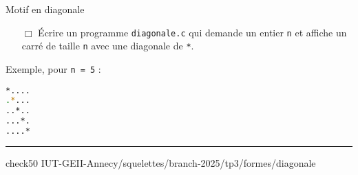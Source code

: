 \begin{UPSTIManipulation}{Motif en diagonale}
	\begin{itemize}
		\item[$\Box$] Écrire un programme \texttt{diagonale.c} qui demande un entier \texttt{n} et affiche un carré de taille \texttt{n} avec une diagonale de \texttt{*}.
	\end{itemize}
	Exemple, pour \texttt{n = 5} :
	\begin{lstlisting}[language=bash,style=console]
*....
.*...
..*..
...*.
....*
\end{lstlisting}
	\hrule
	check50 IUT-GEII-Annecy/squelettes/branch-2025/tp3/formes/diagonale
\end{UPSTIManipulation}
